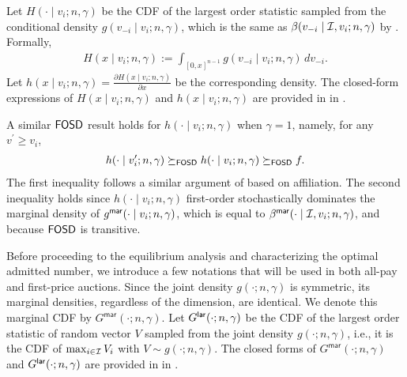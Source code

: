 Let $H(\cdot\mid v_i;n,\gamma)$ be the CDF of the largest order statistic sampled from the conditional density $g(v_{-i}\mid v_i;n,\gamma)$, which is the same as $\beta(v_{-i} \mid \mathcal{I},v_i;n,\gamma)$ by . Formally,
\begin{align}
\label{eq:H_CDF}
H(x\mid v_i;n,\gamma):=\int_{[0,x]^{n-1}} g(v_{-i}\mid v_i;n,\gamma) \, dv_{-i}.
\end{align}
Let $h(x\mid v_i;n,\gamma)=\frac{\partial H(x\mid v_i;n,\gamma)}{\partial x}$ be the corresponding density.
The closed-form expressions of $H(x\mid v_i;n,\gamma)$ and $h(x\mid v_i;n,\gamma)$ are provided in  in .

A similar $\mathsf{FOSD}$ result holds for $h(\cdot \mid v_i;n,\gamma)$ when $\gamma=1$, namely, for any $v^\prime \geq v_i$,
\begin{align*}
h(\cdot \mid v_i^\prime;n,\gamma) \succeq_{\mathsf{FOSD}} h(\cdot \mid v_i;n,\gamma) \succeq_{\mathsf{FOSD}} f.
\end{align*}
The first inequality follows a similar argument of  based on affiliation.
The second inequality holds since $h(\cdot \mid v_i;n,\gamma)$ first-order stochastically dominates the marginal density of $g^{\mathsf{mar}}(\cdot\mid v_i;n,\gamma)$, which is equal to $\beta^{\mathsf{mar}}(\cdot \mid \mathcal{I},v_i;n,\gamma)$, and because $\mathsf{FOSD}$ is transitive.

Before proceeding to the equilibrium analysis and characterizing the optimal admitted number, we introduce a few notations that will be used in both all-pay and first-price auctions. Since the joint density $g(\cdot;n,\gamma)$ is symmetric, its marginal densities, regardless of the dimension, are identical.
We denote this marginal CDF by $G^{\mathsf{mar}}(\cdot;n,\gamma)$. Let $G^{\mathsf{lar}}(\cdot; n,\gamma)$ be the CDF of the largest order statistic of random vector $V$ sampled from the joint density $g(\cdot;n,\gamma)$, i.e., it is the CDF of $\max_{i\in \mathcal{I}}V_i$ with $V\sim g(\cdot;n,\gamma)$.
The closed forms of $G^{\mathsf{mar}}(\cdot;n,\gamma)$ and $G^{\mathsf{lar}}(\cdot; n,\gamma)$ are provided in  in . 